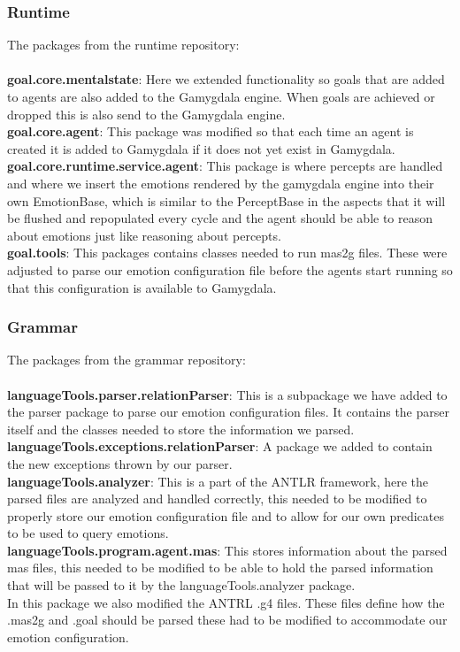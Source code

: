 \documentclass[]{article}
\begin{document}
\subsubsection{Runtime}
The packages from the runtime repository: \\ \\
\textbf{goal.core.mentalstate}: Here we extended functionality so goals that are added to agents are also added to the Gamygdala engine. When goals are achieved or dropped this is also send to the Gamygdala engine. \\
\textbf{goal.core.agent}: This package was modified so that each time an agent is created it is added to Gamygdala if it does not yet exist in Gamygdala. \\
\textbf{goal.core.runtime.service.agent}: This package is where percepts are handled and where we insert the emotions rendered by the gamygdala engine into their own EmotionBase, which is similar to the PerceptBase in the aspects that it will be flushed and repopulated every cycle and the agent should be able to reason about emotions just like reasoning about percepts. \\
\textbf{goal.tools}: This packages contains classes needed to run mas2g files. These were adjusted to parse our emotion configuration file before the agents start running so that this configuration is available to Gamygdala.


\subsubsection{Grammar}
The packages from the grammar repository: \\ \\
\textbf{languageTools.parser.relationParser}: This is a subpackage we have added to the parser package to parse our emotion configuration files. It contains the parser itself and the classes needed to store the information we parsed.\\
\textbf{languageTools.exceptions.relationParser}: A package we added to contain the new exceptions thrown by our parser. \\
\textbf{languageTools.analyzer}: This is a part of the ANTLR framework, here the parsed files are analyzed and handled correctly, this needed to be modified to properly store our emotion configuration file and to allow for our own predicates to be used to query emotions. \\
\textbf{languageTools.program.agent.mas}: This stores information about the parsed mas files, this needed to be modified to be able to hold the parsed information that will be passed to it by the languageTools.analyzer package.
\\
In this package we also modified the ANTRL .g4 files. These files define how the .mas2g and .goal should be parsed these had to be modified to accommodate our emotion configuration.
\newpage
\end{document}
